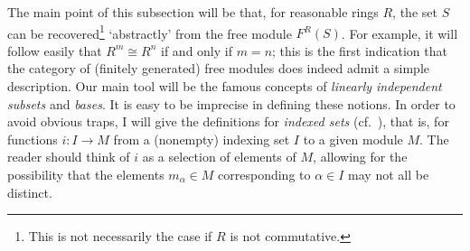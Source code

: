 The main point of this subsection will be that, for reasonable rings
$R$, the set $S$ can be recovered\footnote{This is not necessarily the
  case if $R$ is not commutative.} `abstractly' from the free module
$F^R(S)$. For example, it will follow easily that $R^m \cong R^n$ if
and only if $m = n$; this is the first indication that the category of
(finitely generated) free modules does indeed admit a simple
description.  Our main tool will be the famous concepts of
\emph{linearly independent subsets} and \emph{bases}. It is easy to be
imprecise in defining these notions. In order to avoid obvious traps,
I will give the definitions for \emph{indexed sets} (cf.\
), that is,
for functions $i : I \to M$ from a (nonempty) indexing set $I$ to a
given module $M$. The reader should think of $i$ as a selection of
elements of $M$, allowing for the possibility that the elements
$m_\alpha \in M$ corresponding to $\alpha \in I$ may not all be
distinct.

